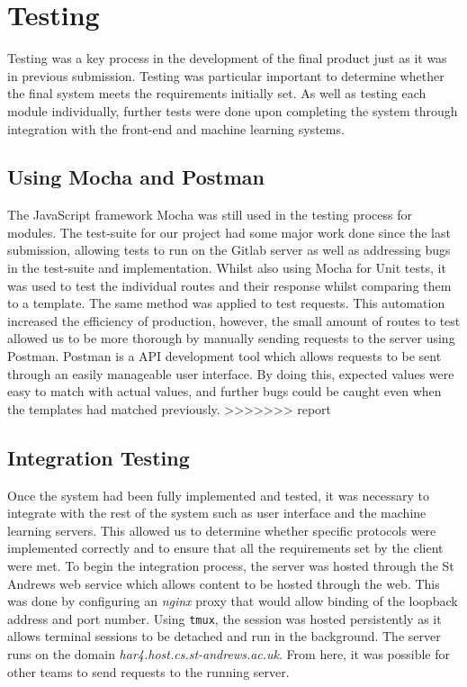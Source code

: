 \section{Testing}
Testing was a key process in the development of the final product just as it was in previous submission. Testing was particular important to determine whether the final system meets the requirements initially set. As well as testing each module individually, further tests were done upon completing the system through integration with the front-end and machine learning systems.

\subsection{Using Mocha and Postman}
The JavaScript framework Mocha was still used in the testing process for modules. The test-suite for our project had some major work done since the last submission, allowing tests to run on the Gitlab server as well as addressing bugs in the test-suite and implementation. Whilst also using Mocha for Unit tests, it was used to test the individual routes and their response whilst comparing them to a template. The same method was applied to test requests. This automation increased the efficiency of production, however, the small amount of routes to test allowed us to be more thorough by manually sending requests to the server using Postman. Postman is a API development tool which allows requests to be sent through an easily manageable user interface. By doing this, expected values were easy to match with actual values, and further bugs could be caught even when the templates had matched previously.
>>>>>>> report
\subsection{Integration Testing}
Once the system had been fully implemented and tested, it was necessary to integrate with the rest of the system such as user interface and the machine learning servers. This allowed us to determine whether specific protocols were implemented correctly and to ensure that all the requirements set by the client were met. To begin the integration process, the server was hosted through the St Andrews web service which allows content to be hosted through the web. This was done by configuring an \textit{nginx} proxy that would allow binding of the loopback address and port number. Using \texttt{tmux}, the session was hosted persistently as it allows terminal sessions to be detached and run in the background. The server runs on the domain \textit{har4.host.cs.st-andrews.ac.uk}. From here, it was possible for other teams to send requests to the running server.
